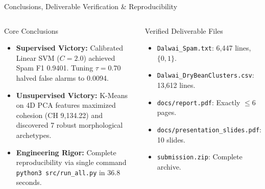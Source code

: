 \documentclass[aspectratio=169,10pt]{beamer}
\begin{document}
\begin{frame}{Conclusions, Deliverable Verification \& Reproducibility}
\begin{columns}
\begin{block}{Core Conclusions}
\small
\begin{itemize}
  \item \textbf{Supervised Victory:} Calibrated Linear SVM ($C=2.0$) achieved Spam F1 0.9401. Tuning $\tau=0.70$ halved false alarms to 0.0094.
  \item \textbf{Unsupervised Victory:} K-Means on 4D PCA features maximized cohesion (CH 9,134.22) and discovered 7 robust morphological archetypes.
  \item \textbf{Engineering Rigor:} Complete reproducibility via single command \texttt{python3 src/run\_all.py} in 36.8 seconds.
\end{itemize}
\end{block}
\begin{block}{Verified Deliverable Files}
\small
\begin{itemize}
  \item \texttt{Dalwai\_Spam.txt}: 6,447 lines, $\{0, 1\}$.
  \item \texttt{Dalwai\_DryBeanClusters.csv}: 13,612 lines.
  \item \texttt{docs/report.pdf}: Exactly $\le 6$ pages.
  \item \texttt{docs/presentation\_slides.pdf}: 10 slides.
  \item \texttt{submission.zip}: Complete archive.
\end{itemize}
\end{block}
\end{columns}
\end{frame}
\end{document}
